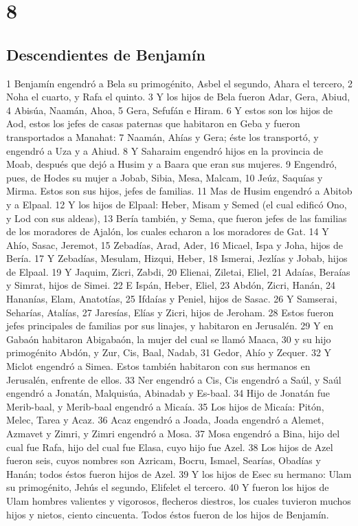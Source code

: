 \chapter{8}

\section*{Descendientes de Benjamín}

1 Benjamín engendró a Bela su primogénito, Asbel el segundo, Ahara el tercero,
2 Noha el cuarto, y Rafa el quinto.
3 Y los hijos de Bela fueron Adar, Gera, Abiud,
4 Abisúa, Naamán, Ahoa,
5 Gera, Sefufán e Hiram. 
6 Y estos son los hijos de Aod, estos los jefes de casas paternas que habitaron en Geba y fueron transportados a Manahat:
7 Naamán, Ahías y Gera; éste los transportó, y engendró a Uza y a Ahiud.
8 Y Saharaim engendró hijos en la provincia de Moab, después que dejó a Husim y a Baara que eran sus mujeres.
9 Engendró, pues, de Hodes su mujer a Jobab, Sibia, Mesa, Malcam,
10 Jeúz, Saquías y Mirma. Estos son sus hijos, jefes de familias.
11 Mas de Husim engendró a Abitob y a Elpaal.
12 Y los hijos de Elpaal: Heber, Misam y Semed (el cual edificó Ono, y Lod con sus aldeas),
13 Bería también, y Sema, que fueron jefes de las familias de los moradores de Ajalón, los cuales echaron a los moradores de Gat.
14 Y Ahío, Sasac, Jeremot,
15 Zebadías, Arad, Ader,
16 Micael, Ispa y Joha, hijos de Bería.
17 Y Zebadías, Mesulam, Hizqui, Heber,
18 Ismerai, Jezlías y Jobab, hijos de Elpaal.
19 Y Jaquim, Zicri, Zabdi,
20 Elienai, Ziletai, Eliel,
21 Adaías, Beraías y Simrat, hijos de Simei.
22 E Ispán, Heber, Eliel,
23 Abdón, Zicri, Hanán,
24 Hananías, Elam, Anatotías,
25 Ifdaías y Peniel, hijos de Sasac.
26 Y Samserai, Seharías, Atalías,
27 Jaresías, Elías y Zicri, hijos de Jeroham.
28 Estos fueron jefes principales de familias por sus linajes, y habitaron en Jerusalén.
29 Y en Gabaón habitaron Abigabaón, la mujer del cual se llamó Maaca,
30 y su hijo primogénito Abdón, y Zur, Cis, Baal, Nadab,
31 Gedor, Ahío y Zequer.
32 Y Miclot engendró a Simea. Estos también habitaron con sus hermanos en Jerusalén, enfrente de ellos.
33 Ner engendró a Cis, Cis engendró a Saúl, y Saúl engendró a Jonatán, Malquisúa, Abinadab y Es-baal.
34 Hijo de Jonatán fue Merib-baal, y Merib-baal engendró a Micaía.
35 Los hijos de Micaía: Pitón, Melec, Tarea y Acaz.
36 Acaz engendró a Joada, Joada engendró a Alemet, Azmavet y Zimri, y Zimri engendró a Mosa.
37 Mosa engendró a Bina, hijo del cual fue Rafa, hijo del cual fue Elasa, cuyo hijo fue Azel.
38 Los hijos de Azel fueron seis, cuyos nombres son Azricam, Bocru, Ismael, Searías, Obadías y Hanán; todos éstos fueron hijos de Azel.
39 Y los hijos de Esec su hermano: Ulam su primogénito, Jehús el segundo, Elifelet el tercero.
40 Y fueron los hijos de Ulam hombres valientes y vigorosos, flecheros diestros, los cuales tuvieron muchos hijos y nietos, ciento cincuenta. Todos éstos fueron de los hijos de Benjamín.

